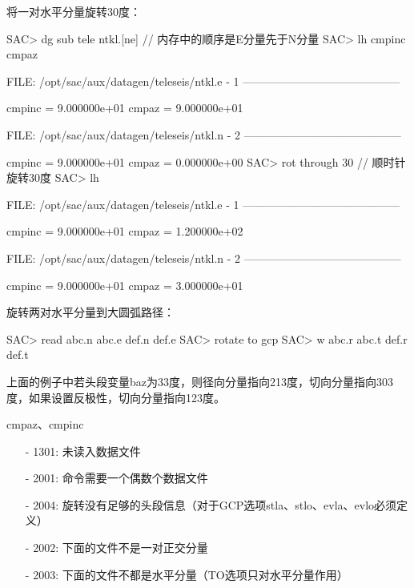 将一对水平分量旋转30度：
\begin{SACCode}
SAC> dg sub tele ntkl.[ne]          // 内存中的顺序是E分量先于N分量
SAC> lh cmpinc cmpaz
  
  FILE: /opt/sac/aux/datagen/teleseis/ntkl.e - 1
 ------------------------------------------

     cmpinc = 9.000000e+01
      cmpaz = 9.000000e+01
  
  FILE: /opt/sac/aux/datagen/teleseis/ntkl.n - 2
 ------------------------------------------

     cmpinc = 9.000000e+01
      cmpaz = 0.000000e+00
SAC> rot through 30                 // 顺时针旋转30度
SAC> lh
  
  FILE: /opt/sac/aux/datagen/teleseis/ntkl.e - 1
 ------------------------------------------

     cmpinc = 9.000000e+01
      cmpaz = 1.200000e+02
  
  FILE: /opt/sac/aux/datagen/teleseis/ntkl.n - 2
 ------------------------------------------

     cmpinc = 9.000000e+01
      cmpaz = 3.000000e+01
\end{SACCode}

旋转两对水平分量到大圆弧路径：
\begin{SACCode}
SAC> read abc.n abc.e def.n def.e
SAC> rotate to gcp
SAC> w abc.r abc.t def.r def.t
\end{SACCode}
上面的例子中若头段变量baz为33度，则径向分量指向213度，切向分量指向303度，如果设置反极性，切向分量指向123度。

cmpaz、cmpinc

\begin{itemize}
\item[-]1301: 未读入数据文件
\item[-]2001: 命令需要一个偶数个数据文件
\item[-]2004: 旋转没有足够的头段信息（对于GCP选项stla、stlo、evla、evlo必须定义）
\item[-]2002: 下面的文件不是一对正交分量
\item[-]2003: 下面的文件不都是水平分量（TO选项只对水平分量作用）
\end{itemize}
